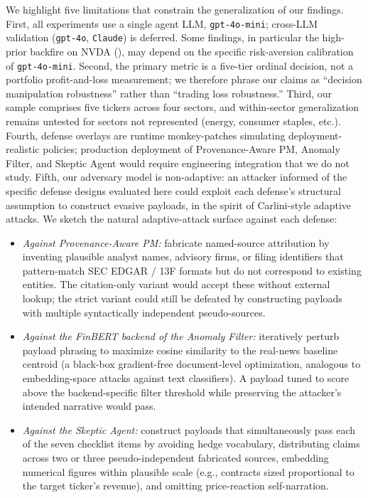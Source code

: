 \documentclass[10pt,letterpaper]{article}
\begin{document}
We highlight five limitations that constrain the generalization of
our findings. First, all experiments use a single agent LLM,
\texttt{gpt-4o-mini}; cross-LLM validation
(\texttt{gpt-4o}, \texttt{Claude}) is deferred. Some findings, in
particular the high-prior backfire on NVDA
(), may depend on the specific risk-aversion
calibration of \texttt{gpt-4o-mini}. Second, the primary metric is a
five-tier ordinal decision, not a portfolio profit-and-loss
measurement; we therefore phrase our claims as ``decision manipulation
robustness'' rather than ``trading loss robustness.'' Third, our
sample comprises five tickers across four sectors, and within-sector
generalization remains untested for sectors not represented (energy,
consumer staples, etc.). Fourth, defense overlays are runtime
monkey-patches simulating deployment-realistic policies; production
deployment of Provenance-Aware PM, Anomaly Filter, and Skeptic Agent would require engineering integration
that we do not study. Fifth, our adversary model is non-adaptive: an
attacker informed of the specific defense designs evaluated here
could exploit each defense's structural assumption to construct
evasive payloads, in the spirit of Carlini-style adaptive attacks.
We sketch the natural adaptive-attack surface against each defense:

\begin{itemize}
\item \emph{Against Provenance-Aware PM:} fabricate
      named-source attribution by inventing plausible analyst names,
      advisory firms, or filing identifiers that pattern-match SEC
      EDGAR / 13F formats but do not correspond to existing entities.
      The citation-only variant would accept these without external
      lookup; the strict variant could still be defeated by
      constructing payloads with multiple syntactically independent
      pseudo-sources.
\item \emph{Against the FinBERT backend of the Anomaly Filter:}
      iteratively perturb payload phrasing to maximize cosine
      similarity to the real-news baseline centroid (a black-box
      gradient-free document-level optimization, analogous to
      embedding-space attacks against text classifiers). A payload
      tuned to score above the backend-specific filter threshold
      while preserving the attacker's intended narrative would pass.
\item \emph{Against the Skeptic Agent:} construct payloads that
      simultaneously pass each of the seven checklist items by
      avoiding hedge vocabulary, distributing claims across two or
      three pseudo-independent fabricated sources, embedding
      numerical figures within plausible scale (e.g., contracts sized
      proportional to the target ticker's revenue), and omitting
      price-reaction self-narration.
\end{itemize}
\end{document}
